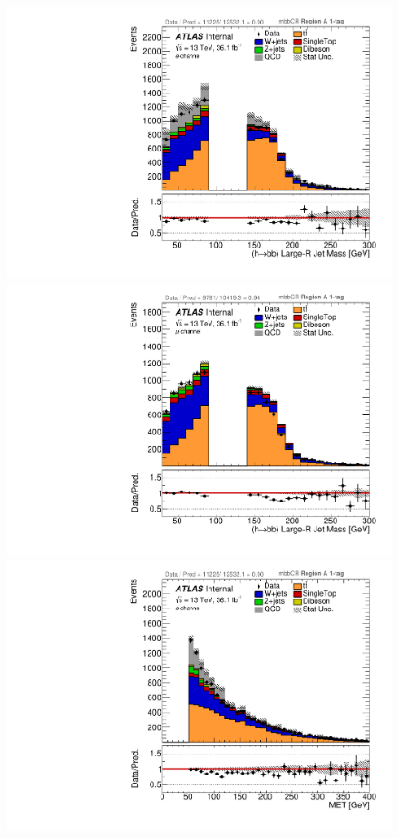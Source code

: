 \begin{figure}[!htbp]
\begin{center}
\includegraphics[scale=0.33]{./figures/boosted/ABCD_1tag0bjet/elec_mbbcr_RegionA_HbbMass_withDD}
\includegraphics[scale=0.33]{./figures/boosted/ABCD_1tag0bjet/muon_mbbcr_RegionA_HbbMass_withDD}\\
\includegraphics[scale=0.33]{./figures/boosted/ABCD_1tag0bjet/elec_mbbcr_RegionA_MET_withDD}  

\end{center}
\end{figure}
